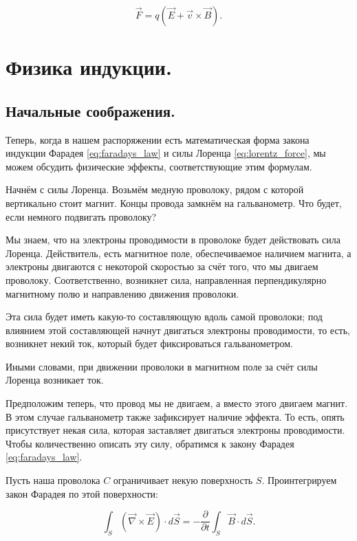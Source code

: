 \documentclass[a4paper,12pt]{article}
\numberwithin{equation}{section}
\newcommand{\pt}{\partial}
\newcommand{\vn}{\vec{\nabla}}
\begin{document}
\begin{equation}
  \label{eq:lorentz_force_full}
  \vec{F} = q \left( \vec{E} + \vec{v} \times \vec{B} \right). 
\end{equation}

\section{Физика индукции.}
\label{sec:induction}

\subsection{Начальные соображения.}
\label{sec:induction_start}



Теперь, когда в нашем распоряжении есть математическая форма закона
индукции Фарадея \eqref{eq:faradays_law} и силы Лоренца
\eqref{eq:lorentz_force}, мы можем обсудить физические эффекты,
соответствующие этим формулам. 

Начнём с силы Лоренца. Возьмём медную проволоку, рядом с которой
вертикально стоит магнит. Концы провода замкнём на гальванометр. Что
будет, если немного подвигать проволоку? 

Мы знаем, что на электроны проводимости в проволоке будет действовать
сила Лоренца. Действитель, есть магнитное поле, обеспечиваемое
наличием магнита, а электроны двигаются с некоторой скоростью за счёт
того, что мы двигаем проволоку. Соответственно, возникнет сила,
направленная перпендикулярно магнитному полю и направлению движения
проволоки. 

Эта сила будет иметь какую-то составляющую вдоль самой проволоки; под
влиянием этой составляющей начнут двигаться электроны проводимости, то
есть, возникнет некий ток, который будет фиксироваться
гальванометром. 

Иными словами, при движении проволоки в магнитном поле за счёт силы
Лоренца возникает ток. 

Предположим теперь, что провод мы не двигаем, а вместо этого двигаем
магнит. В этом случае гальванометр также зафиксирует наличие
эффекта. То есть, опять присутствует некая сила, которая заставляет
двигаться электроны проводимости. Чтобы количественно описать эту
силу, обратимся к закону Фарадея \eqref{eq:faradays_law}. 

Пусть наша проволока $C$ ограничивает некую поверхность
$S$. Проинтегрируем закон Фарадея по этой поверхности: 

\begin{equation}
  \label{eq:eds_1}
  \int_S \left( \vn \times \vec{E} \right) \cdot d\vec{S} = -
  \frac{\pt}{\pt t} \int_S \vec{B} \cdot d\vec{S}.
\end{equation}
\end{document}
